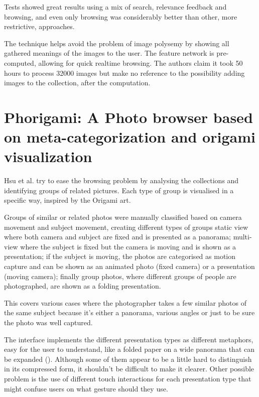 Tests showed great results using a mix of search, relevance feedback and browsing, and even only browsing was considerably better than other, more restrictive, approaches.

The technique helps avoid the problem of image polysemy by showing all gathered meanings of the images to the user.
The feature network is pre-computed, allowing for quick realtime browsing. The authors claim it took 50 hours to process 32000 images but make no reference to the possibility adding images to the collection, after the computation.


\section{Phorigami: A Photo browser based on meta-categorization and origami visualization} %
\label{sub:Hsu}

Hsu et al. \cite{Hsu:2009p2696} try to ease the browsing problem by analysing the collections and identifying groups of related pictures. Each type of group is visualised in a specific way, inspired by the Origami art.

Groups of similar or related photos were manually classified based on camera movement and subject movement, creating different types of groups static view where both camera and subject are fixed and is presented as a panorama; multi-view where the subject is fixed but the camera is moving and is shown as a presentation; if the subject is moving, the photos are categorised as motion capture and can be shown as an animated photo (fixed camera) or a presentation (moving camera); finally group photos, where different groups of people are photographed, are shown as a folding presentation.

This covers various cases where the photographer takes a few similar photos of the same subject because it's either a panorama, various angles or just to be sure the photo was well captured. 

The interface implements the different presentation types as different metaphors, easy for the user to understand, like a folded paper on a wide panorama that can be expanded (). Although some of them appear to be a little hard to distinguish in its compressed form, it shouldn't be difficult to make it clearer. Other possible problem is the use of different touch interactions for each presentation type that might confuse users on what gesture should they use.

